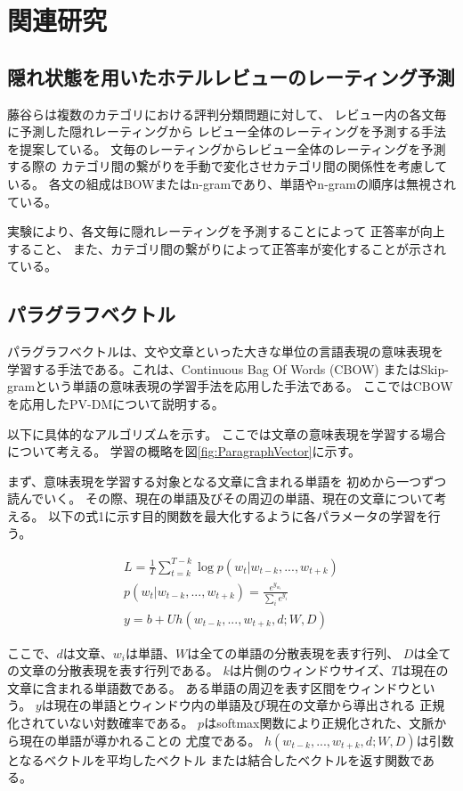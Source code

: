 \documentclass[twocolumn,a4paper]{ltjarticle}
\begin{document}
\section{関連研究}

\subsection{隠れ状態を用いたホテルレビューのレーティング予測}

藤谷ら\cite{fujitani15}は複数のカテゴリにおける評判分類問題に対して、
レビュー内の各文毎に予測した隠れレーティングから
レビュー全体のレーティングを予測する手法を提案している。
文毎のレーティングからレビュー全体のレーティングを予測する際の
カテゴリ間の繋がりを手動で変化させカテゴリ間の関係性を考慮している。
各文の組成はBOWまたはn-gramであり、単語やn-gramの順序は無視されている。

実験により、各文毎に隠れレーティングを予測することによって
正答率が向上すること、
また、カテゴリ間の繋がりによって正答率が変化することが示されている。


\subsection{パラグラフベクトル}

パラグラフベクトルは、文や文章といった大きな単位の言語表現の意味表現を
学習する手法である。これは、Continuous Bag Of Words (CBOW)
またはSkip-gramという単語の意味表現の学習手法を応用した手法である。
ここではCBOWを応用したPV-DMについて説明する。

以下に具体的なアルゴリズムを示す。
ここでは文章の意味表現を学習する場合について考える。
学習の概略を図\ref{fig:ParagraphVector}に示す。

まず、意味表現を学習する対象となる文章に含まれる単語を
初めから一つずつ読んでいく。
その際、現在の単語及びその周辺の単語、現在の文章について考える。
以下の式1に示す目的関数を最大化するように各パラメータの学習を行う。

\begin{gather}
  L = \frac{1}{T} \sum^{T - k}_{t = k} \log p(w_t | w_{t-k}, ..., w_{t+k}) \\
  p(w_t | w_{t-k}, ..., w_{t+k}) = \frac{e^{y_{w_t}}}{\sum_i e^{y_i}} \\
  y = b + Uh(w_{t-k}, ..., w_{t+k}, d; W, D)
\end{gather}

ここで、$d$は文章、$w_i$は単語、$W$は全ての単語の分散表現を表す行列、
$D$は全ての文章の分散表現を表す行列である。
$k$は片側のウィンドウサイズ、$T$は現在の文章に含まれる単語数である。
ある単語の周辺を表す区間をウィンドウという。
$y$は現在の単語とウィンドウ内の単語及び現在の文章から導出される
正規化されていない対数確率である。
$p$はsoftmax関数により正規化された、文脈から現在の単語が導かれることの
尤度である。
$h(w_{t-k}, ..., w_{t+k}, d; W, D)$は引数となるベクトルを平均したベクトル
または結合したベクトルを返す関数である。
\end{document}
